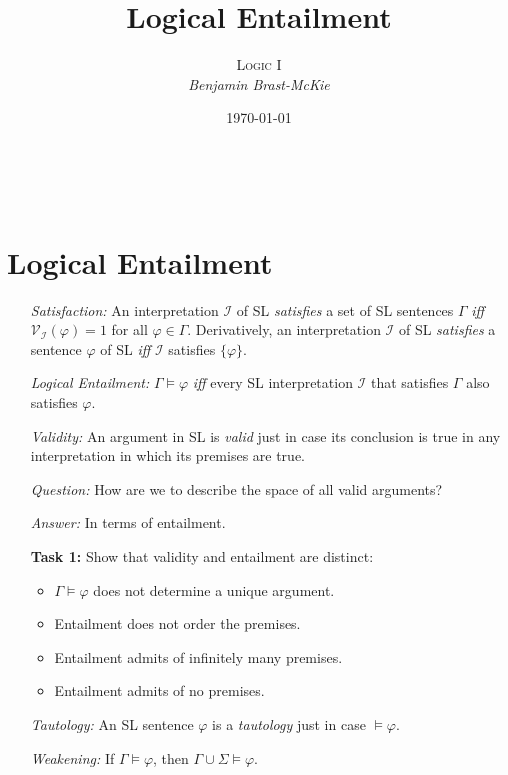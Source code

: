 \documentclass[a4paper, 11pt]{article} %
\title{\textbf{Logical Entailment}} %
\author{\textsc{Logic I}\\ \em Benjamin Brast-McKie} %
\date{\today} %
\makeatletter
\newcommand{\set}[1]{\lbrace#1\rbrace} %
\newcommand{\I}{\mathcal{I}}
\newcommand{\V}[1]{\mathcal{V}_{#1}} %
\renewcommand{\maketitle}{ %
\begin{flushright} %
{\LARGE\@title} %

\vspace{10pt} %

{\@author} %
\\\@date %

\vspace{-10pt} %
\end{flushright}
}
\makeatother
\begin{document}
\maketitle %

\thispagestyle{empty}


\section*{Logical Entailment}

\begin{enumerate}[leftmargin=1.2in,labelsep=.15in] %
  \item[\it Satisfaction:] An interpretation $\I$ of SL \textit{satisfies} a set of SL sentences $\Gamma$ \textit{iff} $\V{\I}(\varphi)=1$ for all $\varphi \in \Gamma$. Derivatively, an interpretation $\I$ of SL \textit{satisfies} a sentence $\varphi$ of SL \textit{iff} $\I$ satisfies $\set{\varphi}$.
  \item[\it Logical Entailment:] $\Gamma \vDash \varphi$ \textit{iff} every SL interpretation $\I$ that satisfies $\Gamma$ also satisfies $\varphi$.
  \item[\it Validity:] An argument in SL is \textit{valid} just in case its conclusion is true in any interpretation in which its premises are true.
  \item[\it Question:] How are we to describe the space of all valid arguments?
  \item[\it Answer:] In terms of entailment.
  \item[\bf Task 1:] Show that validity and entailment are distinct:
    \begin{itemize}
      \item $\Gamma \vDash \varphi$ does not determine a unique argument. 
      \item Entailment does not order the premises.
      \item Entailment admits of infinitely many premises.
      \item Entailment admits of no premises.
    \end{itemize}
  \item[\it Tautology:] An SL sentence $\varphi$ is a \textit{tautology} just in case $\vDash \varphi$.
  \item[\it Weakening:] If $\Gamma \vDash \varphi$, then $\Gamma \cup \Sigma \vDash \varphi$.
\end{enumerate}
\end{document}
